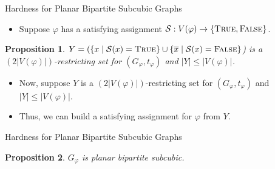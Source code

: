 \documentclass[10pt,aspectratio=169,english]{beamer}
\newtheorem{proposition}{Proposition}
\begin{document}
\begin{frame}{Hardness for Planar Bipartite Subcubic Graphs}
	\begin{itemize}
		\item Suppose $\varphi$ has a satisfying assignment $\mathcal{S}:V(\varphi) \rightarrow \{\textsc{True}, \textsc{False}\}$.
	\end{itemize}
	
	\begin{proposition}
		$Y = (\{x \mid \mathcal{S}(x) = \textsc{True}\} \cup \{\overline{x} \mid \mathcal{S}(x) = \textsc{False}\}$) is a $(2|V(\varphi)|)$-restricting set for $(G_{\varphi}, t_{\varphi})$ and $|Y| \leq |V(\varphi)|$.
	\end{proposition}
	
	\begin{itemize}
		\item<2> Now, suppose $Y$ is a $(2|V(\varphi)|)$-restricting set for $(G_{\varphi}, t_{\varphi})$ and $|Y| \leq |V(\varphi)|$. 
	\end{itemize}
	
	
	\begin{itemize}
		\item<2> Thus, we can build a satisfying assignment for $\varphi$ from $Y$.
	\end{itemize}
\end{frame}

\begin{frame}{Hardness for Planar Bipartite Subcubic Graphs}
	\begin{proposition}
		$G_{\varphi}$ is planar bipartite subcubic.
	\end{proposition}
\end{frame}
\end{document}
